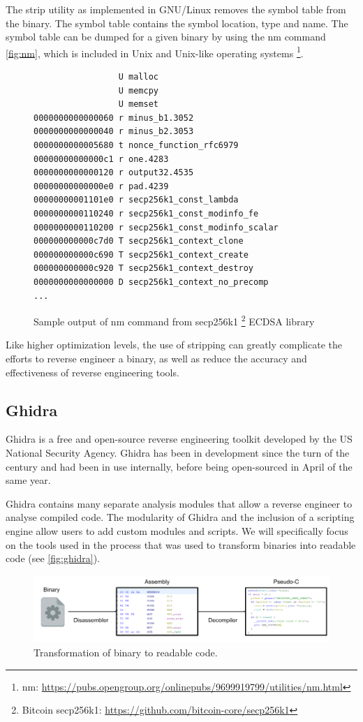 The strip utility as implemented in GNU/Linux removes the symbol table from the binary. The symbol table contains the symbol location, type and name. The symbol table can be dumped for a given binary by using the nm command \ref{fig:nm}, which is included in Unix and Unix-like operating systems \footnote{nm: \url{https://pubs.opengroup.org/onlinepubs/9699919799/utilities/nm.html}}. 

\label{fig:nm}
\begin{figure}[!h]
  \centering
\begin{lstlisting}
                 U malloc
                 U memcpy
                 U memset
0000000000000060 r minus_b1.3052
0000000000000040 r minus_b2.3053
0000000000005680 t nonce_function_rfc6979
00000000000000c1 r one.4283
0000000000000120 r output32.4535
00000000000000e0 r pad.4239
00000000001101e0 r secp256k1_const_lambda
0000000000110240 r secp256k1_const_modinfo_fe
0000000000110200 r secp256k1_const_modinfo_scalar
000000000000c7d0 T secp256k1_context_clone
000000000000c690 T secp256k1_context_create
000000000000c920 T secp256k1_context_destroy
0000000000000000 D secp256k1_context_no_precomp
...
\end{lstlisting}
  \caption{Sample output of nm command from secp256k1 \protect\footnote{Bitcoin secp256k1: \protect\url{https://github.com/bitcoin-core/secp256k1}} ECDSA library}
\end{figure}

Like higher optimization levels, the use of stripping can greatly complicate the efforts to reverse engineer a binary, as well as reduce the accuracy and effectiveness of reverse engineering tools. 
\newpage
\subsection{Ghidra}
Ghidra is a free and open-source reverse engineering toolkit developed by the US National Security Agency. Ghidra has been in development since the turn of the century and had been in use internally, before being open-sourced in April of the same year.

Ghidra contains many separate analysis modules that allow a reverse engineer to analyse compiled code. The modularity of Ghidra and the inclusion of a scripting engine allow users to add custom modules and scripts. We will specifically focus on the tools used in the process that was used to transform binaries into readable code (see \ref{fig:ghidra}).

\label{fig:ghidra}
\begin{figure}[!h]
  \centering
  \includegraphics[width=\linewidth]{img/ghidra.png}
  \caption{Transformation of binary to readable code.}
\end{figure}

